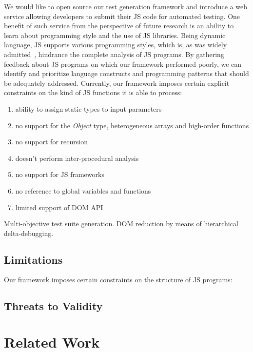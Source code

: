 \documentclass[sigconf]{acmart}
\begin{document}
We would like to open source our test generation framework and introduce a web service allowing developers to submit their JS code for automated testing. One benefit of such service from the perspective of future research is an ability to learn about programming style and the use of JS libraries. Being dynamic language, JS supports various programming styles, which is, as was widely admitted~\cite{paper}, hindrance the complete analysis of JS programs. By gathering feedback about JS programs on which our framework performed poorly, we can identify and prioritize language constructs and programming patterns that should be adequately addressed. Currently, our framework imposes certain explicit constraints on the kind of JS functions it is able to process: 
\begin{enumerate}
\item ability to assign static types to input parameters 
\item no support for the \emph{Object} type, heterogeneous arrays and high-order functions
\item no support for recursion
\item doesn't perform inter-procedural analysis
\item no support for JS frameworks
\item no reference to global variables and functions
\item limited support of DOM API     
\end{enumerate}

Multi-objective test suite generation. DOM reduction by means of hierarchical delta-debugging.

\subsection{Limitations}
\label{sub.sec.eval.limit}

Our framework imposes certain constraints on the structure of JS programs:



\subsection{Threats to Validity}
\label{sub.sec.thhreats}

\section{Related Work}
\label{sec:related.work}
\end{document}
